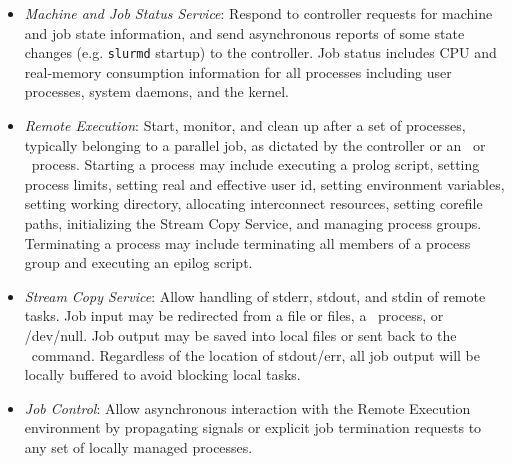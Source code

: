 \begin{itemize}
\item {\em Machine and Job Status Service}:  Respond to controller 
requests for machine and job state information, and send asynchronous 
reports of some state changes (e.g. {\tt slurmd} startup) to the controller.
Job status includes CPU and real-memory consumption information for all 
processes including user processes, system daemons, and the kernel. 

\item {\em Remote Execution}: Start, monitor, and clean up after a set
of processes, typically belonging to a parallel job, as dictated by the
controller or an \srun\ or \scancel\ process. Starting a process may
include executing a prolog script, setting process limits, setting real
and effective user id, setting environment variables, setting working
directory, allocating interconnect resources, setting corefile paths,
initializing the Stream Copy Service, and managing
process groups. Terminating a process may include terminating all members
of a process group and executing an epilog script.

\item {\em Stream Copy Service}: Allow handling of stderr, stdout, and
stdin of remote tasks. Job input may be redirected from a file or files, a
\srun\ process, or /dev/null.  Job output may be saved into local files or
sent back to the \srun\ command. Regardless of the location of stdout/err,
all job output will be locally buffered to avoid blocking local tasks.

\item {\em Job Control}: Allow asynchronous interaction with the
Remote Execution environment by propagating signals or explicit job
termination requests to any set of locally managed processes.

%
%
\end{itemize}

